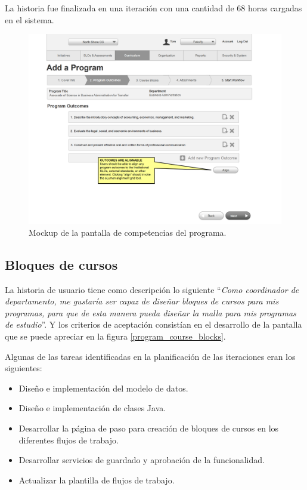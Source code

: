 La historia fue finalizada en una iteración con una cantidad de 68 horas cargadas en el sistema.

\begin{figure}[H]
\centering
\includegraphics[width=125mm,scale=1]{Capitulos/DesarrollodelaAplicacion/Imagenes/program_learning_outcomes}
\caption{Mockup de la pantalla de competencias del programa.}
  \label{program_learning_outcomes}
\end{figure}

\subsection{Bloques de cursos}
La historia de usuario tiene como descripción lo siguiente \enquote{\textit{Como coordinador de departamento, me gustaría ser capaz de diseñar bloques de cursos para mis programas, para que de esta manera pueda diseñar la malla para mis programas de estudio}}. Y los criterios de aceptación consistían en el desarrollo de la pantalla que se puede apreciar en la figura \ref{program_course_blocks}.

Algunas de las tareas identificadas en la planificación de las iteraciones eran los siguientes:
\begin{itemize}
	\item Diseño e implementación del modelo de datos.
	\item Diseño e implementación de clases Java.
	\item Desarrollar la página de paso para creación de bloques de cursos en los diferentes flujos de trabajo.
	\item Desarrollar servicios de guardado y aprobación de la funcionalidad.
	\item Actualizar la plantilla de flujos de trabajo.
\end{itemize}

